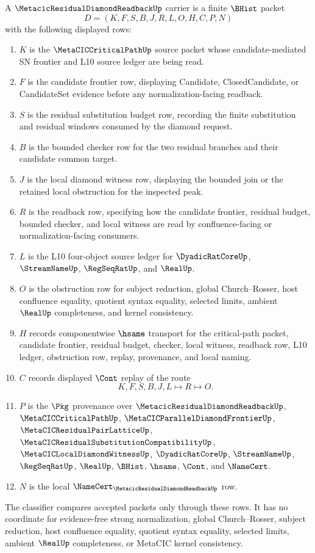\begin{definition}
\label{def:metacic-residual-diamond-readback-carrier}
A $\MetacicResidualDiamondReadbackUp$ carrier is a finite $\BHist$ packet
$$
D=(K,F,S,B,J,R,L,O,H,C,P,N)
$$
with the following displayed rows:
\begin{enumerate}
\item $K$ is the $\MetaCICCriticalPathUp$ source packet whose candidate-mediated SN frontier and L10 source ledger are being read.
\item $F$ is the candidate frontier row, displaying Candidate, ClosedCandidate, or CandidateSet evidence before any normalization-facing readback.
\item $S$ is the residual substitution budget row, recording the finite substitution and residual windows consumed by the diamond request.
\item $B$ is the bounded checker row for the two residual branches and their candidate common target.
\item $J$ is the local diamond witness row, displaying the bounded join or the retained local obstruction for the inspected peak.
\item $R$ is the readback row, specifying how the candidate frontier, residual budget, bounded checker, and local witness are read by confluence-facing or normalization-facing consumers.
\item $L$ is the L10 four-object source ledger for $\DyadicRatCoreUp$, $\StreamNameUp$, $\RegSeqRatUp$, and $\RealUp$.
\item $O$ is the obstruction row for subject reduction, global Church--Rosser, host confluence equality, quotient syntax equality, selected limits, ambient $\RealUp$ completeness, and kernel consistency.
\item $H$ records componentwise $\hsame$ transport for the critical-path packet, candidate frontier, residual budget, checker, local witness, readback row, L10 ledger, obstruction row, replay, provenance, and local naming.
\item $C$ records displayed $\Cont$ replay of the route
$$
K,F,S,B,J,L \longmapsto R \longmapsto O .
$$
\item $P$ is the $\Pkg$ provenance over $\MetacicResidualDiamondReadbackUp$, $\MetaCICCriticalPathUp$, $\MetaCICParallelDiamondFrontierUp$, $\MetaCICResidualPairLatticeUp$, $\MetaCICResidualSubstitutionCompatibilityUp$, $\MetaCICLocalDiamondWitnessUp$, $\DyadicRatCoreUp$, $\StreamNameUp$, $\RegSeqRatUp$, $\RealUp$, $\BHist$, $\hsame$, $\Cont$, and $\NameCert$.
\item $N$ is the local $\NameCert_{\MetacicResidualDiamondReadbackUp}$ row.
\end{enumerate}
The classifier compares accepted packets only through these rows. It has no coordinate for evidence-free strong normalization, global Church--Rosser, subject reduction, host confluence equality, quotient syntax equality, selected limits, ambient $\RealUp$ completeness, or MetaCIC kernel consistency.
\end{definition}

